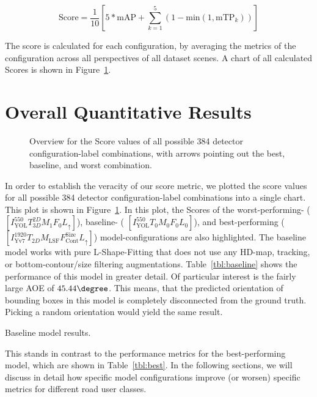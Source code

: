 \[
    \text{Score} = \frac{1}{10} \left[5 * \text{mAP} + \sum^5_{k=1}(1-\text{min}(1, \text{mTP}_k))\right]
\]

The score is calculated for each configuration, by averaging the metrics of the configuration across all perspectives of all dataset scenes.
A chart of all calculated Scores is shown in Figure~\ref{fig:all-scores}.


\section{Overall Quantitative Results}
\label{sec:baseline}

\begin{figure}[htb]
    
    \caption{Overview for the Score values of all possible 384 detector configuration-label combinations, with arrows pointing out the best, baseline, and worst combination.}
    \label{fig:all-scores}
\end{figure}

In order to establish the veracity of our score metric, we plotted the score values for all possible 384 detector configuration-label combinations into a single chart.
This plot is shown in Figure~\ref{fig:all-scores}.
In this plot, the Scores of the worst-performing- ($\left[I^{550}_\text{YOL}T^{2D}_{3D}M_1F_0L_{\uparrow}\right]$), baseline- ( $\left[I^{550}_\text{YOL}T_0M_0F_0L_0\right]$), and best-performing ($\left[I^{1920}_\text{Yv7}T_{2D}M_\text{LSF}F_\text{Cont}^\text{Size}L_{\uparrow}\right]$) model-configurations are also highlighted.
The baseline model works with pure L-Shape-Fitting that does not use any HD-map, tracking, or bottom-contour/size filtering augmentations.
Table~\ref{tbl:baseline} shows the performance of this model in greater detail.
Of particular interest is the fairly large AOE of $45.44\degree$.
This means, that the predicted orientation of bounding boxes in this model is  completely disconnected from the ground truth.
Picking a random orientation would yield the same result.

\begin{table}[htbp]
    
    \caption{Baseline model results.}
    \label{tbl:baseline}
\end{table}

This stands in contrast to the performance metrics for the best-performing model, which are shown in Table~\ref{tbl:best}.
In the following sections, we will discuss in detail how specific model configurations improve (or worsen) specific metrics for different road user classes.

